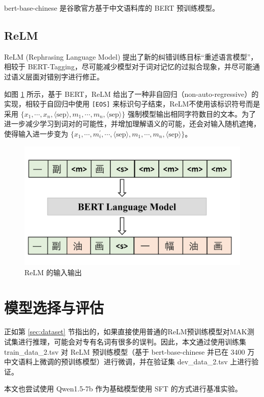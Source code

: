 \documentclass{sjtuarticle}
\newcommand{\file}[1]{\textsf{#1}}
\begin{document}
bert-base-chinese \cite{bertc}是谷歌官方基于中文语料库的 BERT 预训练模型。

\subsection{ReLM}
ReLM (Rephrasing Language Model) \cite{relm} 提出了新的纠错训练目标“重述语言模型”，相较于 BERT-Tagging，尽可能减少模型对于词对记忆的过拟合现象，并尽可能通过语义层面对错别字进行修正。

如图 \ref{fig:relm} 所示，基于 BERT，ReLM 给出了一种非自回归（non-auto-regressive）的实现，相较于自回归中使用 \verb"[EOS]" 来标识句子结束，ReLM不使用该标识符号而是采用 $\{x_1,\cdots,x_n,\langle\text{sep}\rangle,m_1,\cdots,m_n,\langle\text{sep}\rangle\}$ 强制模型输出相同字符数目的文本。为了进一步减少学习到词对的可能性，并增加理解语义的可能，还会对输入随机遮掩，使得输入进一步变为 $\{x_1,\cdots,m_i^\prime,\cdots,\langle\text{sep}\rangle,m_1,\cdots,m_n,\langle\text{sep}\rangle\}$。

\begin{figure}[h]
    \centering
    \includegraphics{relm.jpg}
    \caption{ReLM 的输入输出}
    \label{fig:relm}
\end{figure}

\section{模型选择与评估}

正如第 \ref{sec:dataset} 节指出的，如果直接使用普通的ReLM预训练模型对MAK测试集进行推理，可能会对专有名词有很多的误判。因此，本文通过使用训练集 \file{train\_data\_2.tsv} 对 ReLM 预训练模型（基于 bert-base-chinese 并已在 3400 万中文语料上微调的预训练模型）进行微调，并在验证集 \file{dev\_data\_2.tsv} 上进行验证。

本文也尝试使用 Qwen1.5-7b \cite{qwen} 作为基础模型使用 SFT 的方式进行基准实验。
\end{document}
